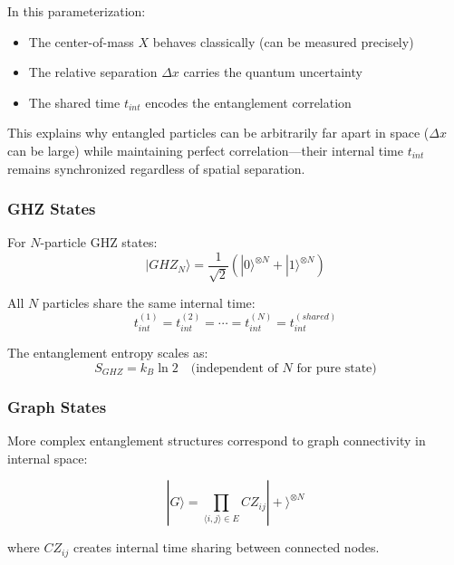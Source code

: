 \begin{insight}
In this parameterization:
\begin{itemize}
    \item The center-of-mass $X$ behaves classically (can be measured precisely)
    \item The relative separation $\Delta x$ carries the quantum uncertainty
    \item The shared time $t_{int}$ encodes the entanglement correlation
\end{itemize}

This explains why entangled particles can be arbitrarily far apart in space ($\Delta x$ can be large) while maintaining perfect correlation—their internal time $t_{int}$ remains synchronized regardless of spatial separation.
\end{insight}

\subsubsection{GHZ States}

For $N$-particle GHZ states:
\begin{equation}
    |GHZ_N\rangle = \frac{1}{\sqrt{2}}(|0\rangle^{\otimes N} + |1\rangle^{\otimes N})
\end{equation}

All $N$ particles share the same internal time:
\begin{equation}
    t_{int}^{(1)} = t_{int}^{(2)} = \cdots = t_{int}^{(N)} = t_{int}^{(shared)}
\end{equation}

The entanglement entropy scales as:
\begin{equation}
    S_{GHZ} = k_B \ln 2 \quad \text{(independent of $N$ for pure state)}
\end{equation}

\subsubsection{Graph States}

More complex entanglement structures correspond to graph connectivity in internal space:

\begin{equation}
    |G\rangle = \prod_{\langle i,j \rangle \in E} CZ_{ij} |+\rangle^{\otimes N}
\end{equation}

where $CZ_{ij}$ creates internal time sharing between connected nodes.

